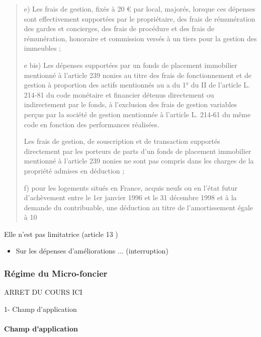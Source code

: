\begin{quote}
	e) Les frais de gestion, fixés à 20 € par local, majorés, lorsque ces dépenses sont effectivement supportées par le propriétaire, des frais de rémunération des gardes et concierges, des frais de procédure et des frais de rémunération, honoraire et commission versés à un tiers pour la gestion des immeubles ;

	e bis) Les dépenses supportées par un fonds de placement immobilier mentionné à l'article 239 nonies au titre des frais de fonctionnement et de gestion à proportion des actifs mentionnés au a du 1° du II de l'article L. 214-81 du code monétaire et financier détenus directement ou indirectement par le fonds, à l'exclusion des frais de gestion variables perçus par la société de gestion mentionnée à l'article L. 214-61 du même code en fonction des performances réalisées.

	Les frais de gestion, de souscription et de transaction supportés directement par les porteurs de parts d'un fonds de placement immobilier mentionné à l'article 239 nonies ne sont pas compris dans les charges de la propriété admises en déduction ;

	f) pour les logements situés en France, acquis neufs ou en l'état futur d'achèvement entre le 1er janvier 1996 et le 31 décembre 1998 et à la demande du contribuable, une déduction au titre de l'amortissement égale à 10 %
				\end{quote}


			Elle n'est pas limitatrice (article 13 )

			\begin{itemize}
				\item Sur les dépenses d'améliorations ... (interruption)
			\end{itemize}

			\subsubsection{Régime du Micro-foncier} ARRET DU COURS ICI

				1- Champ d'application
				\paragraph{Champ d'application}

